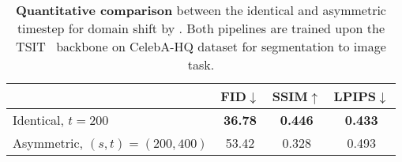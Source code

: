 \setlength{\tabcolsep}{10pt}
\begin{table*}[t]
\centering
\caption{
    \textbf{Quantitative comparison} between the identical and asymmetric timestep for domain shift by \method.
    Both pipelines are trained upon the TSIT~\cite{jiang2020tsit} backbone on CelebA-HQ dataset for segmentation to image task.
}
\label{tab:ablation_s_t_quan}
\vspace{-2pt}
\begin{tabular}{l|ccc}
\toprule
                               & \textbf{FID$\downarrow$} & \textbf{SSIM$\uparrow$} & \textbf{LPIPS$\downarrow$} \\
\midrule
Identical, $t=200$             &                \bf 36.78 &               \bf 0.446 &                  \bf 0.433 \\
Asymmetric, $(s,t)=(200,400) $ &                    53.42 &                   0.328 &                      0.493 \\
\bottomrule
\end{tabular}
\end{table*}

